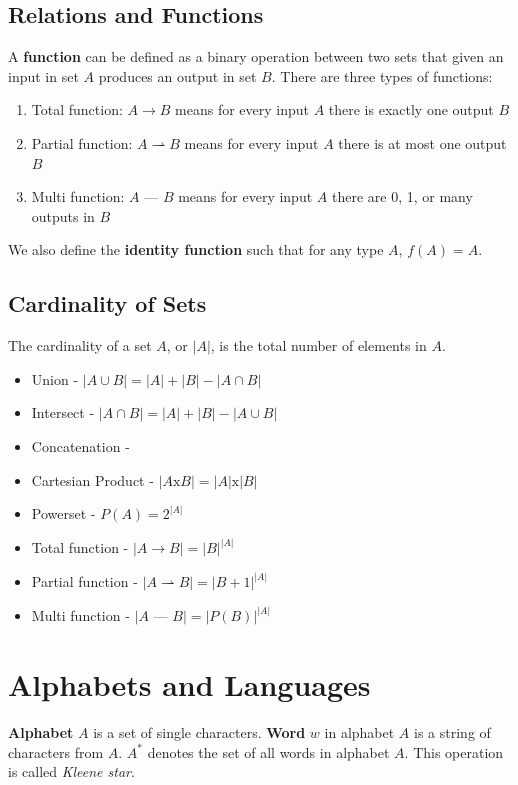 \documentclass{article}
\begin{document}
		\subsection{Relations and Functions}
		A \textbf{function} can be defined as a binary operation between two sets that given an input in set $A$ produces an output in set $B$. There are three types of functions:
		\begin{enumerate}
			\item Total function: $A \rightarrow B$ means for every input $A$ there is exactly one output $B$
			\item Partial function: $A \rightharpoonup B$ means for every input $A$ there is at most one output $B$
			\item Multi function: $A$ --- $B$ means for every input $A$ there are 0, 1, or many outputs in $B$
		\end{enumerate}
		We also define the \textbf{identity function} such that for any type $A$, $f(A) = A$.
		\subsection{Cardinality of Sets}
		The cardinality of a set $A$, or $|A|$, is the total number of elements in $A$.
		\begin{itemize}
				\item Union - $|A \cup B| = |A| + |B| - |A \cap B|$
				\item Intersect - $ |A \cap B| = |A| + |B| - |A\cup B|$
				\item Concatenation - 
				\item Cartesian Product - $|A \text{x} B|  = |A| \text{x} |B|$
				\item Powerset - $P(A) = 2^{|A|}$
				\item Total function - $|A \rightarrow B| = |B|^{|A|}$
				\item Partial function - $|A \rightharpoonup B| = |B+1|^{|A|}$
				\item Multi function - $|A$ --- $B| = |P(B)|^{|A|}$
			\end{itemize}
	\section{Alphabets and Languages}
		\textbf{Alphabet} $A$ is a set of single characters. \textbf{Word} $w$ in alphabet $A$ is a string of characters from $A$. $A^*$ denotes the set of all words in alphabet $A$. This operation is called \emph{Kleene star}.
\end{document}
